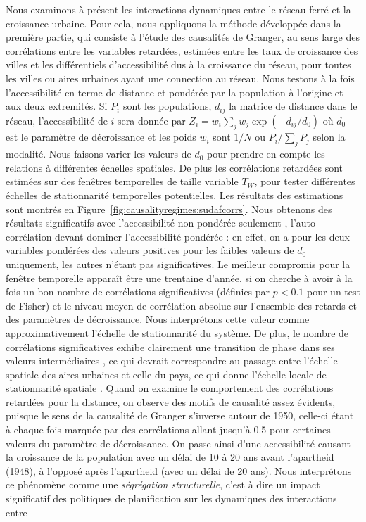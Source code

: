 {Nous examinons à présent les interactions dynamiques entre le réseau ferré et la croissance urbaine. Pour cela, nous appliquons la méthode développée dans la première partie, qui consiste à l'étude des causalités de Granger, au sens large des corrélations entre les variables retardées, estimées entre les taux de croissance des villes et les différentiels d'accessibilité dus à la croissance du réseau, pour toutes les villes ou aires urbaines ayant une connection au réseau. Nous testons à la fois l'accessibilité en terme de distance et pondérée par la population à l'origine et aux deux extremités. Si $P_i$ sont les populations, $d_{ij}$ la matrice de distance dans le réseau, l'accessibilité de $i$ sera donnée par $Z_i = w_i \sum_j w_j \exp \left(- d_{ij} / d_0 \right)$ où $d_0$ est le paramètre de décroissance et les poids $w_i$ sont $1/N$ ou $P_i / \sum_j P_j$ selon la modalité. Nous faisons varier les valeurs de $d_0$ pour prendre en compte les relations à différentes échelles spatiales. De plus les corrélations retardées sont estimées sur des fenêtres temporelles de taille variable $T_W$, pour tester différentes échelles de stationnarité temporelles potentielles. Les résultats des estimations sont montrés en Figure~\ref{fig:causalityregimes:sudafcorrs}. Nous obtenons des résultats significatifs avec l'accessibilité non-pondérée seulement , l'auto-corrélation devant dominer l'accessibilité pondérée : en effet, on a pour les deux variables pondérées des valeurs positives pour les faibles valeurs de $d_0$ uniquement, les autres n'étant pas significatives. Le meilleur compromis pour la fenêtre temporelle apparaît être une trentaine d'année, si on cherche à avoir à la fois un bon nombre de corrélations significatives (définies par $p<0.1$ pour un test de Fisher) et le niveau moyen de corrélation absolue sur l'ensemble des retards et des paramètres de décroissance. Nous interprétons cette valeur comme approximativement l'échelle de stationnarité du système. De plus, le nombre de corrélations significatives exhibe  clairement une transition de phase dans ses valeurs intermédiaires , ce qui devrait correspondre au passage entre l'échelle spatiale des aires urbaines et celle du pays, ce qui donne l'échelle locale de stationnarité spatiale . Quand on examine le comportement des corrélations retardées pour la distance, on observe des motifs de causalité assez évidents, puisque le sens de la causalité de Granger s'inverse autour de 1950, celle-ci étant à chaque fois marquée par des corrélations allant jusqu'à 0.5 pour certaines valeurs du paramètre de décroissance. On passe ainsi d'une accessibilité causant la croissance de la population avec un délai de 10 à 20 ans avant l'apartheid (1948), à l'opposé  après l'apartheid (avec un délai de 20 ans). Nous interprétons ce phénomène comme une \emph{ségrégation structurelle}, c'est à dire un impact significatif des politiques de planification sur les dynamiques des interactions entre }
